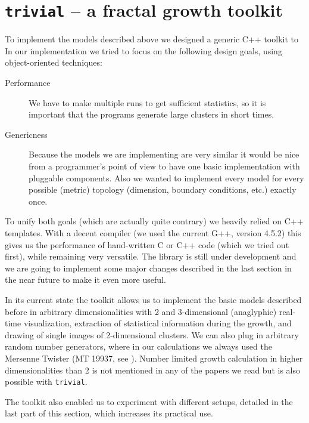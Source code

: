 \documentclass[twocolumn, 10pt]{scrartcl}
\begin{document}
    \section{\lstinline!trivial! -- a fractal growth toolkit}
        To implement the models described above we designed a generic C++ toolkit to 
        In our implementation we tried to focus on the following design goals, using object-oriented techniques:
        \begin{description}
            \item[Performance] We have to make multiple runs to get sufficient statistics, so it is important that the
                programs generate large clusters in short times.
            \item[Genericness] Because the models we are implementing are very similar it would be nice from a
                programmer's point of view to have one basic implementation with pluggable components. Also we wanted to
                implement every model for every possible (metric) topology (dimension, boundary conditions, etc.)
                exactly once.
        \end{description}
        To unify both goals (which are actually quite contrary) we heavily relied on C++ templates. With a decent
        compiler (we used the current G++, version 4.5.2) this gives us the performance of hand-written C or C++ code
        (which we tried out first), while remaining very versatile. The library is still under development and we are
        going to implement some major changes described in the last section in the near future to make it even more
        useful.

        In its current state the toolkit allows us to implement the basic models described before in arbitrary
        dimensionalities with 2 and 3-dimensional (anaglyphic) real-time visualization, extraction of statistical
        information during the growth, and drawing of single images of 2-dimensional clusters. We can also plug in
        arbitrary random number generators, where in our calculations we always used the Mersenne Twister (MT 19937, see
        \cite{src-matsumoto}).  Number limited growth calculation in higher dimensionalities than 2 is not mentioned in
        any of the papers we read but is also possible with \lstinline'trivial'.

        The toolkit also enabled us to experiment with different setups, detailed in the last part of this section,
        which increases its practical use.
\end{document}
